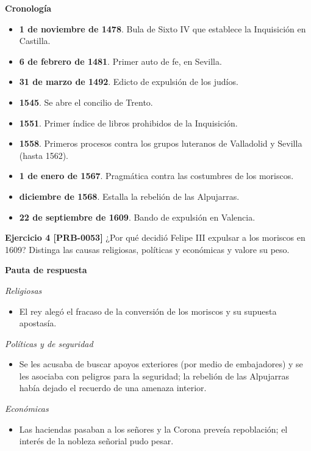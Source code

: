 \documentclass{book}
\begin{document}
\noindent\textbf{Cronología}
\begin{itemize}
\item \textbf{1 de noviembre de 1478}. Bula de Sixto IV que establece la Inquisición en Castilla.
\item \textbf{6 de febrero de 1481}. Primer auto de fe, en Sevilla.
\item \textbf{31 de marzo de 1492}. Edicto de expulsión de los judíos.
\item \textbf{1545}. Se abre el concilio de Trento.
\item \textbf{1551}. Primer índice de libros prohibidos de la Inquisición.
\item \textbf{1558}. Primeros procesos contra los grupos luteranos de Valladolid y Sevilla (hasta 1562).
\item \textbf{1 de enero de 1567}. Pragmática contra las costumbres de los moriscos.
\item \textbf{diciembre de 1568}. Estalla la rebelión de las Alpujarras.
\item \textbf{22 de septiembre de 1609}. Bando de expulsión en Valencia.
\end{itemize}

\noindent\textbf{Ejercicio 4 [PRB-0053]}
¿Por qué decidió Felipe III expulsar a los moriscos en 1609? Distinga las causas religiosas, políticas y económicas y valore su peso.


\noindent\textbf{Pauta de respuesta}

\noindent\textit{Religiosas}
\begin{itemize}
\item El rey alegó el fracaso de la conversión de los moriscos y su supuesta apostasía.
\end{itemize}

\noindent\textit{Políticas y de seguridad}
\begin{itemize}
\item Se les acusaba de buscar apoyos exteriores (por medio de embajadores) y se les asociaba con peligros para la seguridad; la rebelión de las Alpujarras había dejado el recuerdo de una amenaza interior.
\end{itemize}

\noindent\textit{Económicas}
\begin{itemize}
\item Las haciendas pasaban a los señores y la Corona preveía repoblación; el interés de la nobleza señorial pudo pesar.
\end{itemize}
\end{document}
